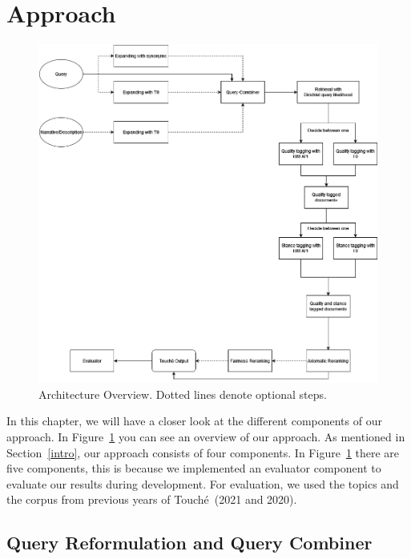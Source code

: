 \section{Approach}\label{approach}

\begin{figure}
    \centering
    \includegraphics[width=1\linewidth]{figures/pipeline.png}
    \caption{Architecture Overview. Dotted lines denote optional steps.}
    \label{figure-pipeline}
\end{figure}

In this chapter, we will have a closer look at the different components of our approach.
In Figure~\ref{figure-pipeline} you can see an overview of our approach.
As mentioned in Section~\ref{intro}, our approach consists of four components.
In Figure~\ref{figure-pipeline} there are five components, this is because we implemented an evaluator component to evaluate our results during development.
For evaluation, we used the topics and the corpus from previous years of Touché~(2021 and 2020).

\subsection{Query Reformulation and Query Combiner}\label{reformulation}

